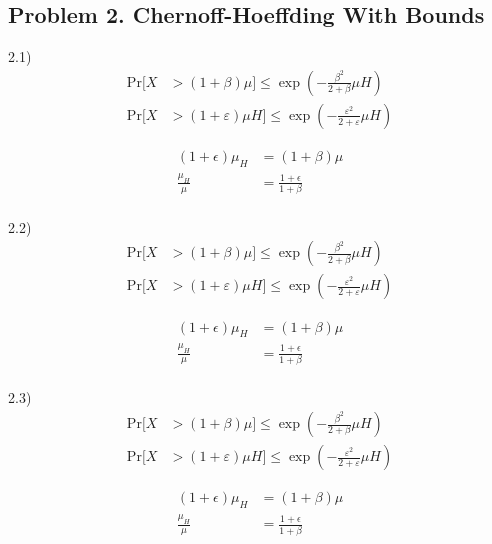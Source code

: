\documentclass[12pt]{article}
\begin{document}
	\vspace{2in} %
	
	
	\subsection*{Problem 2. Chernoff-Hoeffding With Bounds}
	2.1)
	\begin{align*}
		\mathrm{Pr}[X &> (1+\beta)\mu]\leq\exp\left(-\frac{\beta^{2}}{2+\beta}\mu H\right) \\
		\mathrm{Pr}[X &> (1+\varepsilon)\mu H]\leq\exp\left(-\frac{\varepsilon^{2}}{2+\varepsilon}\mu H\right)
	\end{align*}

	\begin{align*}
		(1 + \epsilon) \mu_{H} &= (1 + \beta) \mu \\
		\frac{\mu_{H}}{\mu} &= \frac{1 + \epsilon}{1 + \beta}\\
	\end{align*}


	2.2)
	\begin{align*}
		\mathrm{Pr}[X &> (1+\beta)\mu]\leq\exp\left(-\frac{\beta^{2}}{2+\beta}\mu H\right) \\
		\mathrm{Pr}[X &> (1+\varepsilon)\mu H]\leq\exp\left(-\frac{\varepsilon^{2}}{2+\varepsilon}\mu H\right)
	\end{align*}

	\begin{align*}
		(1 + \epsilon) \mu_{H} &= (1 + \beta) \mu \\
		\frac{\mu_{H}}{\mu} &= \frac{1 + \epsilon}{1 + \beta}\\
	\end{align*}

	2.3)
	\begin{align*}
		\mathrm{Pr}[X &> (1+\beta)\mu]\leq\exp\left(-\frac{\beta^{2}}{2+\beta}\mu H\right) \\
		\mathrm{Pr}[X &> (1+\varepsilon)\mu H]\leq\exp\left(-\frac{\varepsilon^{2}}{2+\varepsilon}\mu H\right)
	\end{align*}

	\begin{align*}
		(1 + \epsilon) \mu_{H} &= (1 + \beta) \mu \\
		\frac{\mu_{H}}{\mu} &= \frac{1 + \epsilon}{1 + \beta}\\
	\end{align*}
	
\end{document}
